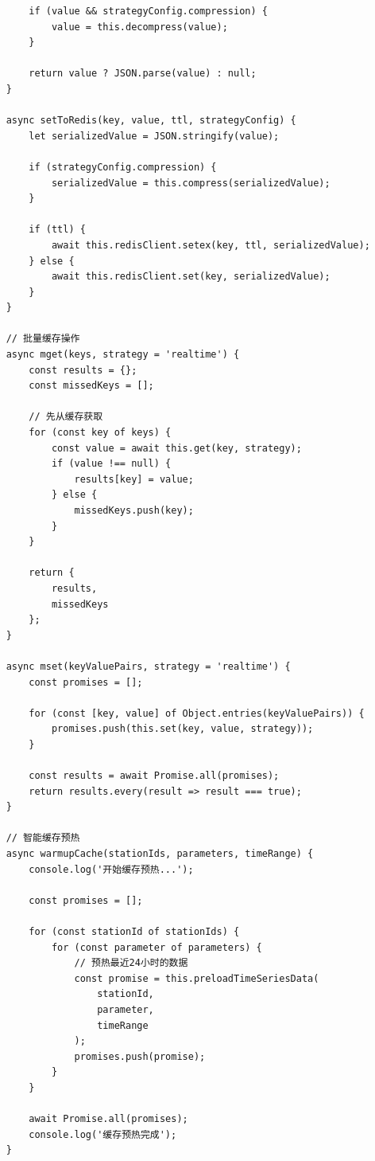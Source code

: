 \begin{lstlisting}
        if (value && strategyConfig.compression) {
            value = this.decompress(value);
        }
        
        return value ? JSON.parse(value) : null;
    }
    
    async setToRedis(key, value, ttl, strategyConfig) {
        let serializedValue = JSON.stringify(value);
        
        if (strategyConfig.compression) {
            serializedValue = this.compress(serializedValue);
        }
        
        if (ttl) {
            await this.redisClient.setex(key, ttl, serializedValue);
        } else {
            await this.redisClient.set(key, serializedValue);
        }
    }
    
    // 批量缓存操作
    async mget(keys, strategy = 'realtime') {
        const results = {};
        const missedKeys = [];
        
        // 先从缓存获取
        for (const key of keys) {
            const value = await this.get(key, strategy);
            if (value !== null) {
                results[key] = value;
            } else {
                missedKeys.push(key);
            }
        }
        
        return {
            results,
            missedKeys
        };
    }
    
    async mset(keyValuePairs, strategy = 'realtime') {
        const promises = [];
        
        for (const [key, value] of Object.entries(keyValuePairs)) {
            promises.push(this.set(key, value, strategy));
        }
        
        const results = await Promise.all(promises);
        return results.every(result => result === true);
    }
    
    // 智能缓存预热
    async warmupCache(stationIds, parameters, timeRange) {
        console.log('开始缓存预热...');
        
        const promises = [];
        
        for (const stationId of stationIds) {
            for (const parameter of parameters) {
                // 预热最近24小时的数据
                const promise = this.preloadTimeSeriesData(
                    stationId, 
                    parameter, 
                    timeRange
                );
                promises.push(promise);
            }
        }
        
        await Promise.all(promises);
        console.log('缓存预热完成');
    }
    

\end{lstlisting}
